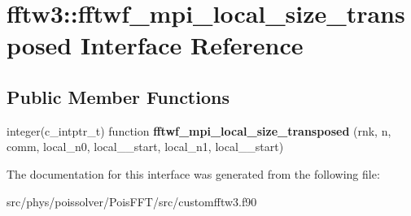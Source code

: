 \hypertarget{interfacefftw3_1_1fftwf__mpi__local__size__transposed}{}\section{fftw3\+:\+:fftwf\+\_\+mpi\+\_\+local\+\_\+size\+\_\+transposed Interface Reference}
\label{interfacefftw3_1_1fftwf__mpi__local__size__transposed}
\subsection*{Public Member Functions}
\begin{DoxyCompactItemize}
\item 
integer(c\+\_\+intptr\+\_\+t) function {\bfseries fftwf\+\_\+mpi\+\_\+local\+\_\+size\+\_\+transposed} (rnk, n, comm, local\+\_\+n0, local\+\_\+\_\+start, local\+\_\+n1, local\+\_\+\_\+start)\hypertarget{interfacefftw3_1_1fftwf__mpi__local__size__transposed_a94eaab76cd63802366c8b17f7f628f61}{}\label{interfacefftw3_1_1fftwf__mpi__local__size__transposed_a94eaab76cd63802366c8b17f7f628f61}

\end{DoxyCompactItemize}


The documentation for this interface was generated from the following file\+:\begin{DoxyCompactItemize}
\item 
src/phys/poissolver/\+Pois\+F\+F\+T/src/customfftw3.\+f90\end{DoxyCompactItemize}
